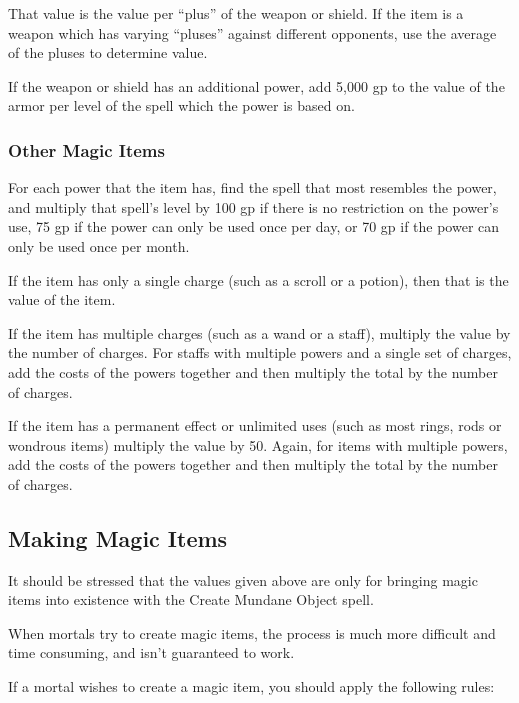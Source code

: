 \begin{multicols*}{2}
That value is the value per “plus” of the weapon or shield. If the item is a weapon which has varying “pluses” against different opponents, use the average of the pluses to determine value.

If the weapon or shield has an additional power, add 5,000 gp to the value of the armor per level of the spell which the power is based on.

\subsubsection{Other Magic Items}
For each power that the item has, find the spell that most resembles the power, and multiply that spell’s level by 100 gp if there is no restriction on the power’s use, 75 gp if the power can only be used once per day, or 70 gp if the power can only be used once per month.

If the item has only a single charge (such as a scroll or a potion), then that is the value of the item.

If the item has multiple charges (such as a wand or a staff), multiply the value by the number of charges. For staffs with multiple powers and a single set of charges, add the costs of the powers together and then multiply the total by the number of charges.

If the item has a permanent effect or unlimited uses (such as most rings, rods or wondrous items) multiply the value by 50. Again, for items with multiple powers, add the costs of the powers together and then multiply the total by the number of charges.

\subsection{Making Magic Items}
It should be stressed that the values given above are only for  bringing magic items into existence with the Create Mundane Object spell.

When mortals try to create magic items, the process is much more difficult and time consuming, and isn’t guaranteed to work.

If a mortal wishes to create a magic item, you should apply the following rules:


\end{multicols*}
